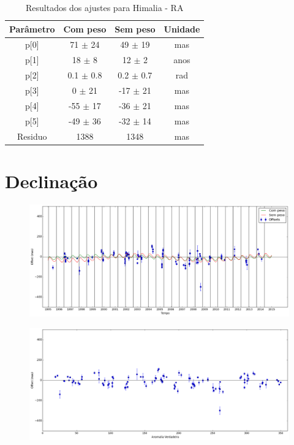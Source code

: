 \documentclass[11pt,a4paper]{report}
\begin{document}
\begin{table}[h!]
\caption{\label{Tab: Himalia-RA} Resultados dos ajustes para Himalia - RA}
\begin{centering}
\begin{tabular}{cccc}
\hline
\hline
Parâmetro & Com peso & Sem peso & Unidade\tabularnewline
\hline
p[0] & 71 $\pm$ 24 & 49 $\pm$ 19 & mas\\
p[1] & 18 $\pm$ 8 & 12 $\pm$ 2 & anos\\
p[2] & 0.1 $\pm$ 0.8 & 0.2 $\pm$ 0.7 & rad\\
p[3] & 0 $\pm$ 21 & -17 $\pm$ 21 & mas\\
p[4] & -55 $\pm$ 17 & -36 $\pm$ 21 & mas\\
p[5] & -49 $\pm$ 36 & -32 $\pm$ 14 & mas\\
Residuo & 1388 & 1348 & mas\\
\hline 
\end{tabular} 
\par\end{centering}
\end{table}

\section*{Declinação}

\begin{figure}[h]
\includegraphics[scale=0.35]{Himalia/DEC.png} 
\end{figure}

\begin{figure}[h]
\includegraphics[scale=0.35]{Himalia/DEC_anom.png}  
\end{figure}
\end{document}
